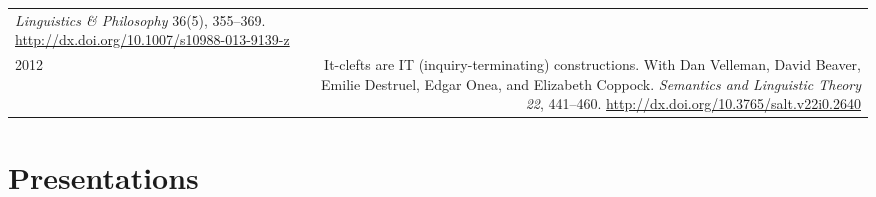 \documentclass[12pt]{article}
\newcommand{\doi}[1]{\url{http://dx.doi.org/#1}}
\newcommand{\refmark}{\textcolor{gray}{\textdagger}}
\begin{document}
\begin{longtable}{LR}
          \textit{Linguistics \& Philosophy} 36(5), 355--369.\newline
          \doi{10.1007/s10988-013-9139-z}\\ %
  2012  & It-clefts are IT (inquiry-terminating) constructions.\newline
          With Dan Velleman, David Beaver, Emilie Destruel, Edgar Onea, and
          Elizabeth Coppock.\newline
          \textit{Semantics and Linguistic Theory 22}, 441--460.\newline
          \doi{10.3765/salt.v22i0.2640}
\end{longtable}
\endgroup

\medskip

\section*{Presentations}
\end{document}
